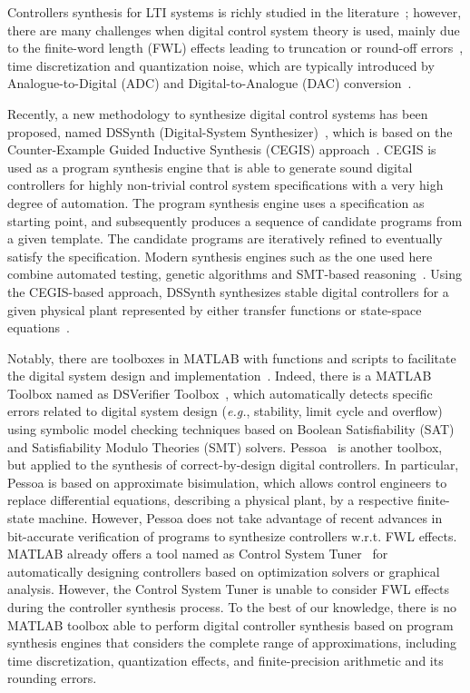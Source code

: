 \documentclass[10pt,conference]{IEEEtran}
\begin{document}
Controllers synthesis for LTI systems is richly studied in the
literature~\cite{mazo2010pessoa,DBLP:conf/emsoft/RavanbakhshS16,economakos2016automated};
however, there are many challenges when digital control system theory is
used, mainly due to the finite-word length (FWL) effects leading to
truncation or round-off errors~\cite{Guang2013, Istepanian2001}, time
discretization and quantization noise, which are typically introduced by
Analogue-to-Digital (ADC) and Digital-to-Analogue (DAC)
conversion~\cite{astrom1997computer}.

Recently, a new methodology to synthesize digital control systems has been
proposed, named DSSynth (Digital-System Synthesizer)~\cite{abate2017,
abatecav2017}, which is based on the Counter-Example Guided Inductive
Synthesis (CEGIS) approach~\cite{DBLP:conf/asplos/Solar-LezamaTBSS06}. 
CEGIS is used as a program synthesis engine that is able to generate sound
digital controllers for highly non-trivial control system specifications
with a very high degree of automation.  The program synthesis engine uses a
specification as starting point, and subsequently produces a sequence of
candidate programs from a given template.  The candidate programs are
iteratively refined to eventually satisfy the specification.  Modern
synthesis engines such as the one used here combine automated testing,
genetic algorithms and SMT-based
reasoning~\cite{DBLP:journals/corr/AlurFSS16a, DBLP:conf/lpar/DavidKL15}. 
Using the CEGIS-based approach, DSSynth synthesizes stable digital
controllers for a given physical plant represented by either transfer
functions or state-space equations~\cite{abate2017,abatecav2017}.

Notably, there are toolboxes in MATLAB with functions and scripts to
facilitate the digital system design and
implementation~\cite{matlab-toolbox}.  Indeed, there is a MATLAB Toolbox
named as DSVerifier
Toolbox~\cite{issta2017,DBLP:journals/tc/BessaIPCF17,DBLP:journals/dafes/BessaICF16},
which automatically detects specific errors related to digital system design
({\it e.g.}, stability, limit cycle and overflow) using symbolic model
checking techniques based on Boolean Satisfiability (SAT) and Satisfiability
Modulo Theories (SMT) solvers.  Pessoa~\cite{mazo2010pessoa} is another
toolbox, but applied to the synthesis of correct-by-design digital
controllers.  In particular, Pessoa is based on approximate bisimulation,
which allows control engineers to replace differential equations, describing
a physical plant, by a respective finite-state machine.  However, Pessoa
does not take advantage of recent advances in bit-accurate verification of
programs to synthesize controllers w.r.t.  FWL effects.  MATLAB already
offers a tool named as Control System Tuner~\cite{autotuner} for
automatically designing controllers based on optimization solvers or
graphical analysis.  However, the Control System Tuner is unable to consider
FWL effects during the controller synthesis process.  To the best of our
knowledge, there is no MATLAB toolbox able to perform digital controller
synthesis based on program synthesis engines that considers the complete
range of approximations, including time discretization, quantization
effects, and finite-precision arithmetic and its rounding errors.
\end{document}
